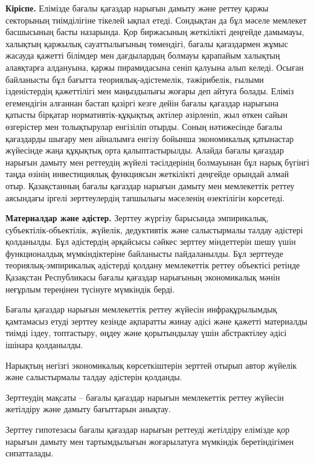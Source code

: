 \begin{multicols}{2}
{\bfseries Кіріспе.} Елімізде бағалы қағаздар нарығын дамыту және реттеу
қаржы секторының тиімділігіне тікелей ықпал етеді. Сондықтан да бұл
мәселе мемлекет басшысының басты назарында. Қор биржасының жеткілікті
деңгейде дамымауы, халықтың қаржылық сауаттылығының төмендігі, бағалы
қағаздармен жұмыс жасауда қажетті білімдер мен дағдылардың болмауы
қарапайым халықтың алаяқтарға алдануына, қаржы пирамидасына сеніп
қалуына алып келеді. Осыған байланысты бұл бағытта
теориялық-әдістемелік, тәжірибелік, ғылыми ізденістердің қажеттілігі мен
маңыздылығы жоғары деп айтуға болады. Еліміз егемендігін алғаннан бастап
қазіргі кезге дейін бағалы қағаздар нарығына қатысты бірқатар
нормативтік-құқықтық актілер әзірленіп, жыл өткен сайын өзгерістер мен
толықтырулар енгізіліп отырды. Соның нәтижесінде бағалы қағаздарды
шығару мен айналымға енгізу бойынша экономикалық қатынастар жүйесінде
жаңа құқықтық орта қалыптастырылды. Алайда бағалы қағаздар нарығын
дамыту мен реттеудің жүйелі тәсілдерінің болмауынан бұл нарық бүгінгі
таңда өзінің инвестициялық функциясын жеткілікті деңгейде орындай алмай
отыр. Қазақстанның бағалы қағаздар нарығын дамыту мен мемлекеттік реттеу
аясындағы іргелі зерттеулердің тапшылығы мәселенің өзектілігін
көрсетеді.

{\bfseries Материалдар және әдістер.} Зерттеу жүргізу барысында
эмпирикалық, субъектілік-объектілік, жүйелік, дедуктивтік және
салыстырмалы талдау әдістері қолданылды. Бұл әдістердің әрқайсысы сәйкес
зерттеу міндеттерін шешу үшін функционалдық мүмкіндіктеріне байланысты
пайдаланылды. Бұл зерттеуде теориялық-эмпирикалық әдістерді қолдану
мемлекеттік реттеу объектісі ретінде Қазақстан Республикасы бағалы
қағаздар нарығының экономикалық мәнін неғұрлым тереңінен түсінуге
мүмкіндік берді.

Бағалы қағаздар нарығын мемлекеттік реттеу жүйесін инфрақұрылымдық
қамтамасыз етуді зерттеу кезінде ақпаратты жинау әдісі және қажетті
материалды тиімді іздеу, топтастыру, өңдеу және қорытындылау үшін
абстрактілеу әдісі ішінара қолданылды.

Нарықтың негізгі экономикалық көрсеткіштерін зерттей отырып автор
жүйелік және салыстырмалы талдау әдістерін қолданды.

Зерттеудің мақсаты -- бағалы қағаздар нарығын мемлекеттік реттеу жүйесін
жетілдіру және дамыту бағыттарын анықтау.

Зерттеу гипотезасы бағалы қағаздар нарығын реттеуді жетілдіру елімізде
қор нарығын дамыту мен тартымдылығын жоғарылатуға мүмкіндік
беретіндігімен сипатталады.


\end{multicols}
